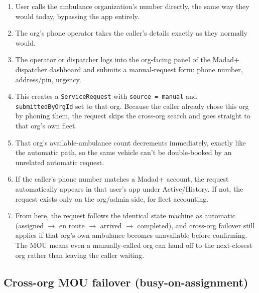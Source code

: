 \documentclass[11pt,a4paper]{article}
\begin{document}
\begin{enumerate}
  \item User calls the ambulance organization's number directly, the same way they would today, bypassing the app entirely.
  \item The org's phone operator takes the caller's details exactly as they normally would.
  \item The operator or dispatcher logs into the org-facing panel of the Madad+ dispatcher dashboard and submits a manual-request form: phone number, address/pin, urgency.
  \item This creates a \texttt{ServiceRequest} with \texttt{source = manual} and \texttt{submittedByOrgId} set to that org. Because the caller already chose this org by phoning them, the request skips the cross-org search and goes straight to that org's own fleet.
  \item That org's available-ambulance count decrements immediately, exactly like the automatic path, so the same vehicle can't be double-booked by an unrelated automatic request.
  \item If the caller's phone number matches a Madad+ account, the request automatically appears in that user's app under Active/History. If not, the request exists only on the org/admin side, for fleet accounting.
  \item From here, the request follows the identical state machine as automatic (assigned $\rightarrow$ en route $\rightarrow$ arrived $\rightarrow$ completed), and cross-org failover still applies if that org's own ambulance becomes unavailable before confirming. The MOU means even a manually-called org can hand off to the next-closest org rather than leaving the caller waiting.
\end{enumerate}

\subsection{Cross-org MOU failover (busy-on-assignment)}
\end{document}
